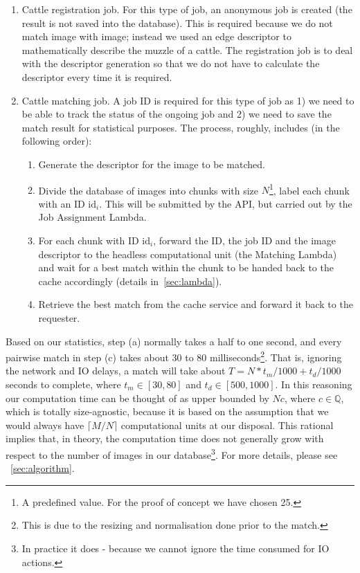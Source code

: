 \begin{enumerate}
	\item Cattle registration job. For this type of job, an anonymous job is created (the result is not saved into the database). This is required because we do not match image with image; instead we used an edge descriptor to mathematically describe the muzzle of a cattle. The registration job is to deal with the descriptor generation so that we do not have to calculate the descriptor every time it is required.
	\item Cattle matching job. A job ID is required for this type of job as 1) we need to be able to track the status of the ongoing job and 2) we need to save the match result for statistical purposes. The process, roughly, includes (in the following order):
	\begin{enumerate}
		\item Generate the descriptor for the image to be matched.
		\item Divide the database of images into chunks with size $N$\footnote{A predefined value. For the proof of concept we have chosen 25.}, label each chunk with an ID $\text{id}_i$. This will be submitted by the API, but carried out by the Job Assignment Lambda.
		\item For each chunk with ID $\text{id}_i$, forward the ID, the job ID and the image descriptor to the headless computational unit (the Matching Lambda) and wait for a best match within the chunk to be handed back to the cache accordingly (details in~\ref{sec:lambda}).
		\item Retrieve the best match from the cache service and forward it back to the requester.
	\end{enumerate}
\end{enumerate}

Based on our statistics, step (a) normally takes a half to one second, and every pairwise match in step (c) takes about 30 to 80 milliseconds\footnote{This is due to the resizing and normalisation done prior to the match.}. That is, ignoring the network and IO delays, a match will take about $T = N * t_m / 1000 + t_d / 1000$ seconds to complete, where $t_m \in [30, 80]$ and $t_d \in [500, 1000]$. In this reasoning our computation time can be thought of as upper bounded by $Nc$, where $c \in \mathbb{Q}$, which is totally size-agnostic, because it is based on the assumption that we would always have $\lceil M / N \rceil$ computational units at our disposal. This rational implies that, in theory, the computation time does not generally grow with respect to the number of images in our database\footnote{In practice it does - because we cannot ignore the time consumed for IO actions.}. For more details, please see ~\ref{sec:algorithm}.

